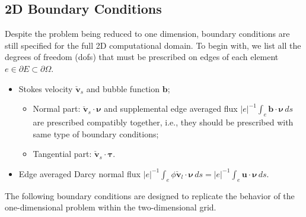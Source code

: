 \subsection{2D Boundary Conditions}
Despite the problem being reduced to one dimension, 
boundary conditions are still specified for the full 2D computational domain.
To begin with, we list all the degrees of freedom (dofs) that must be prescribed on edges of each element 
$e \in \partial E \subset \partial \Omega$.
\begin{itemize}
		  \item Stokes velocity $\check{\mathbf{v}}_s$ and bubble function $\mathbf{b}$;
					 \begin{itemize}
								\item Normal part: $\check{\mathbf{v}}_s \cdot \pmb{\nu}$ and 
										  supplemental edge averaged flux
                                $\lvert e \rvert^{-1}\int_e\mathbf{b}\cdot \pmb{\nu}\,ds$
										  are prescribed compatibly together,
										  i.e., they should be prescribed with same type of boundary conditions;
								\item Tangential part: $\check{\mathbf{v}}_s \cdot \pmb{\tau}$.
					 \end{itemize}

		  \item Edge averaged Darcy normal flux $\lvert e \rvert^{-1}\int_e \phi\check{\mathbf{v}}_l \cdot \pmb{\nu}\, ds = \lvert e \rvert^{-1} \int_e \mathbf{u} \cdot \pmb{\nu}\, ds$.

\end{itemize}
The following boundary conditions are designed to replicate the behavior of the one-dimensional
problem within the two-dimensional grid. 
